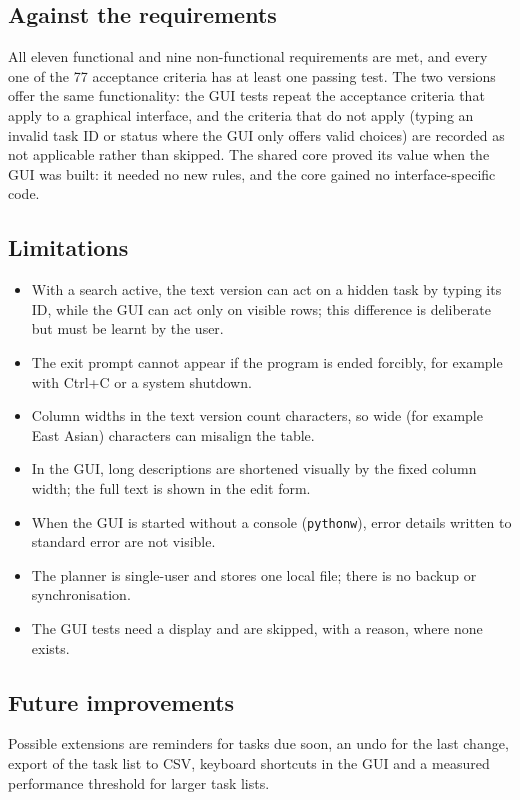 \documentclass[11pt,a4paper]{article}
\newcommand{\code}[1]{\texttt{#1}}
\begin{document}
\subsection{Against the requirements}
All eleven functional and nine non-functional requirements are met, and every
one of the 77 acceptance criteria has at least one passing test. The two
versions offer the same functionality: the GUI tests repeat the acceptance
criteria that apply to a graphical interface, and the criteria that do not
apply (typing an invalid task ID or status where the GUI only offers valid
choices) are recorded as not applicable rather than skipped. The shared core
proved its value when the GUI was built: it needed no new rules, and the core
gained no interface-specific code.

\subsection{Limitations}
\begin{itemize}
  \item With a search active, the text version can act on a hidden task by
        typing its ID, while the GUI can act only on visible rows; this
        difference is deliberate but must be learnt by the user.
  \item The exit prompt cannot appear if the program is ended forcibly, for
        example with Ctrl+C or a system shutdown.
  \item Column widths in the text version count characters, so wide (for
        example East Asian) characters can misalign the table.
  \item In the GUI, long descriptions are shortened visually by the fixed
        column width; the full text is shown in the edit form.
  \item When the GUI is started without a console (\code{pythonw}), error
        details written to standard error are not visible.
  \item The planner is single-user and stores one local file; there is no
        backup or synchronisation.
  \item The GUI tests need a display and are skipped, with a reason, where
        none exists.
\end{itemize}

\subsection{Future improvements}
Possible extensions are reminders for tasks due soon, an undo for the last
change, export of the task list to CSV, keyboard shortcuts in the GUI and a
measured performance threshold for larger task lists.
\end{document}
